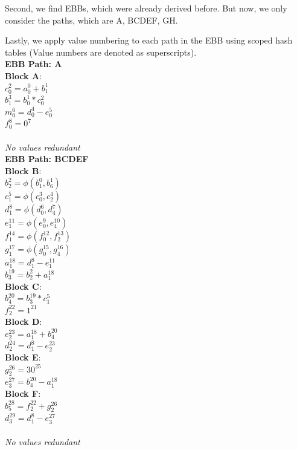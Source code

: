 \documentclass[11pt]{article}
\begin{document}
\begin{enumerate}
\begin{Answer}
		      Second, we find EBBs, which were already derived before. But now, we only consider the paths, which are A, BCDEF, GH.

		      Lastly, we apply value numbering to each path in the EBB using scoped hash tables (Value numbers are denoted as superscripts). \\
		      \textbf{EBB Path: A} \\
		      \textbf{Block A}: \\
		      $c_0^2 = a_0^0 + b_1^1$ \\
		      $b_1^3 = b_0^1 * c_0^2$ \\
		      $m_0^6 = d_0^4 - e_0^5$ \\
		      $f_0^8 = 0^7$ \\
		      \\
		      \textit{No values redundant} \\

		      \textbf{EBB Path: BCDEF} \\
		      \textbf{Block B}: \\
		      $b_2^2 = \phi(b_1^0, b_6^1)$ \\
		      $c_1^5 = \phi(c_0^3, c_2^4)$ \\
		      $d_1^8 = \phi(d_0^6, d_4^7)$ \\
		      $e_1^{11} = \phi(e_0^9, e_4^{10})$ \\
		      $f_1^{14} = \phi(f_0^{12}, f_2^{13})$ \\
		      $g_1^{17} = \phi(g_0^{15}, g_4^{16})$ \\
		      $a_1^{18} = d_1^8 - e_1^{11}$ \\
		      $b_3^{19} = b_2^2 + a_1^{18}$ \\
		      \textbf{Block C}: \\
		      $b_4^{20} = b_3^{19} * c_1^5$ \\
		      $f_2^{22} = 1^{21}$ \\
		      \textbf{Block D}: \\
		      $e_2^{23} = a_1^{18} + b_4^{20}$ \\
		      $d_2^{24} = d_1^{8} - e_2^{23}$ \\
		      \textbf{Block E}: \\
		      $g_2^{26} = 30^{25}$ \\
		      $e_3^{27} = b_4^{20} - a_1^{18}$ \\
		      \textbf{Block F}: \\
		      $b_5^{28} = f_2^{22} + g_2^{26}$ \\
		      $d_3^{29} = d_1^{8} - e_3^{27}$ \\
		      \\
		      \textit{No values redundant} \\


\end{Answer}
\end{enumerate}
\end{document}
